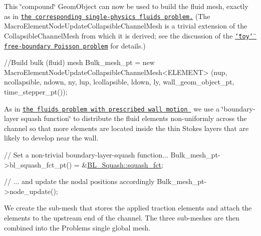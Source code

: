 This \char`\"{}compound\char`\"{} {\ttfamily Geom\+Object} can now be used to build the fluid mesh, exactly as in \href{../../../navier_stokes/collapsible_channel/html/index.html}{\tt the corresponding single-\/physics fluids problem.} (The {\ttfamily Macro\+Element\+Node\+Update\+Collapsible\+Channel\+Mesh} is a trivial extension of the {\ttfamily Collapsible\+Channel\+Mesh} from which it is derived; see the discussion of the \href{../../macro_element_free_boundary_poisson/html/index.html#mesh}{\tt \char`\"{}toy\char`\"{} free-\/boundary Poisson problem} for details.)


\begin{DoxyCodeInclude}
 \textcolor{comment}{//Build bulk (fluid) mesh}
 Bulk\_mesh\_pt = 
  \textcolor{keyword}{new} MacroElementNodeUpdateCollapsibleChannelMesh<ELEMENT>
  (nup, ncollapsible, ndown, ny,
   lup, lcollapsible, ldown, ly,
   wall\_geom\_object\_pt,
   time\_stepper\_pt());

\end{DoxyCodeInclude}


As in \href{../../../navier_stokes/collapsible_channel/html/index.html}{\tt the fluids problem with prescribed wall motion } we use a \char`\"{}boundary-\/layer squash function\char`\"{} to distribute the fluid elements non-\/uniformly across the channel so that more elements are located inside the thin Stokes layers that are likely to develop near the wall.


\begin{DoxyCodeInclude}

 \textcolor{comment}{// Set a non-trivial boundary-layer-squash function...}
 Bulk\_mesh\_pt->bl\_squash\_fct\_pt() = &\hyperlink{namespaceBL__Squash_a0fdaf7661591150041b7102dbe578cdc}{BL\_Squash::squash\_fct}; 

 \textcolor{comment}{// ... and update the nodal positions accordingly}
 Bulk\_mesh\_pt->node\_update();

\end{DoxyCodeInclude}


We create the sub-\/mesh that stores the applied traction elements and attach the elements to the upstream end of the channel. The three sub-\/meshes are then combined into the {\ttfamily Problem\textquotesingle{}s} single global mesh.



